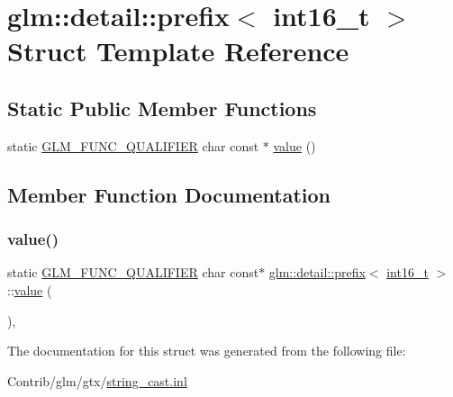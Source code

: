 \hypertarget{structglm_1_1detail_1_1prefix_3_01int16__t_01_4}{}\section{glm\+:\+:detail\+:\+:prefix$<$ int16\+\_\+t $>$ Struct Template Reference}
\label{structglm_1_1detail_1_1prefix_3_01int16__t_01_4}
\subsection*{Static Public Member Functions}
\begin{DoxyCompactItemize}
\item 
static \mbox{\hyperlink{setup_8hpp_a33fdea6f91c5f834105f7415e2a64407}{G\+L\+M\+\_\+\+F\+U\+N\+C\+\_\+\+Q\+U\+A\+L\+I\+F\+I\+ER}} char const  $\ast$ \mbox{\hyperlink{structglm_1_1detail_1_1prefix_3_01int16__t_01_4_a0ccbfcd8a1f5a2b777dbc43bad141bb6}{value}} ()
\end{DoxyCompactItemize}


\subsection{Member Function Documentation}
\mbox{\label{structglm_1_1detail_1_1prefix_3_01int16__t_01_4_a0ccbfcd8a1f5a2b777dbc43bad141bb6}} 
\subsubsection{\texorpdfstring{value()}{value()}}
{\footnotesize\ttfamily static \mbox{\hyperlink{setup_8hpp_a33fdea6f91c5f834105f7415e2a64407}{G\+L\+M\+\_\+\+F\+U\+N\+C\+\_\+\+Q\+U\+A\+L\+I\+F\+I\+ER}} char const$\ast$ \mbox{\hyperlink{structglm_1_1detail_1_1prefix}{glm\+::detail\+::prefix}}$<$ \mbox{\hyperlink{group__gtc__type__precision_gaf89ee61e0d34aa4a462104b7ae7f2da6}{int16\+\_\+t}} $>$\+::\mbox{\hyperlink{_s_d_l__opengl__glext_8h_a8ad81492d410ff2ac11f754f4042150f}{value}} (\begin{DoxyParamCaption}{ }\end{DoxyParamCaption})\hspace{0.3cm}{\ttfamily [inline]}, {\ttfamily [static]}}



The documentation for this struct was generated from the following file\+:\begin{DoxyCompactItemize}
\item 
Contrib/glm/gtx/\mbox{\hyperlink{string__cast_8inl}{string\+\_\+cast.\+inl}}\end{DoxyCompactItemize}
